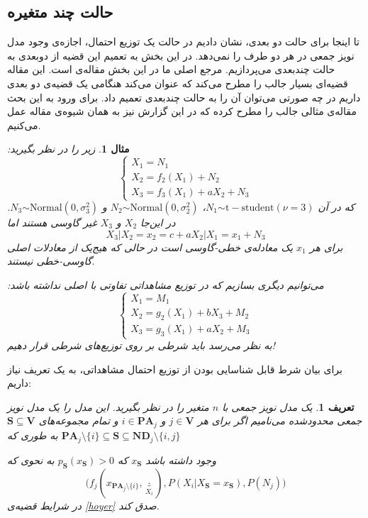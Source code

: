 \documentclass[a4paper,12pt]{article}
\newtheorem{den}{{\large\bf تعریف}}[section]
\newtheorem{exa}{{\large\bf مثال}}[section]
\begin{document}
\subsection{حالت چند متغیره}
تا اینجا برای حالت دو بعدی، نشان دادیم در حالت 
یک توزیع احتمال، اجازه‌ی وجود مدل نویز جمعی در هر دو طرف را نمی‌دهد. در این بخش به تعمیم این قضیه از دوبعدی به حالت چندبعدی می‌پردازیم. مرجع اصلی ما در این بخش مقاله‌ی 
\cite{continous}
است. این مقاله‌ قضیه‌ای بسیار جالب را مطرح می‌کند که عنوان می‌کند هنگامی یک قضیه‌ی 
دو بعدی داریم در چه صورتی می‌توان آن را به حالت چند‌بعدی تعمیم داد. برای ورود به این بحث مقاله‌ی 
\cite{continous}
مثالی جالب را مطرح کرده که در این گزارش نیز به همان شیوه‌ی مقاله عمل می‌کنیم.
\begin{exa}
	زیر را در نظر بگیرید:
	\begin{equation}
	\begin{cases}
	X_1 = N_1\\
	X_2 = f_2(X_1) + N_2\\
	X_3 = f_3(X_1)+aX_2 + N_3
	\end{cases}
	\end{equation}
	که در آن
	$N_1 \stackrel{}{\sim} \mathrm{t-student}(\nu =3)$،
	$N_2 \stackrel{}{\sim} \mathrm{Normal}(0, \sigma_2^2)$ و 
	$N_3 \stackrel{}{\sim}\mathrm{Normal}(0, \sigma_3^2)$.
	در این‌جا $X_2$ و $X_3$ غیر گاوسی هستند  اما
	$$X_3|X_2=x_2 = c + aX_2|X_1=x_1 + N_3$$
	برای هر $x_1$ یک معادله‌ی خطی-گاوسی است در حالی که هیج‌یک از معادلات اصلی 
	گاوسی-خطی نیستند. 
	
	می‌توانیم 
	دیگری بسازیم که در توزیع مشاهداتی تفاوتی با 
	اصلی نداشته باشد:
	\begin{equation}
	\begin{cases}
	X_1 = M_1\\
	X_2 = g_2(X_1) + bX_3 + M_2\\
	X_3 = g_3(X_1)+aX_2 + M_3
	\end{cases}
	\end{equation}
	به نظر می‌رسد باید شرطی بر روی توزیع‌های شرطی قرار دهیم!
\end{exa}
برای بیان شرط قابل شناسایی بودن از توزیع احتمال مشاهداتی، به یک تعریف نیاز داریم:
\begin{den}
	یک مدل نویز جمعی با $n$ متغیر را در نظر بگیرید. این مدل را یک مدل نویز جمعی محدودشده می‌نامیم اگر برای هر 
	$j \in \mathbf{V}$
	و
	$i \in \mathbf{PA}_j$
	و تمام مجموعه‌های
	$\mathbf{S} \subseteq \mathbf{V}$
	به طوری که 
	$\mathbf{PA}_j  \setminus \{i\} \subseteq \mathbf{S} \subseteq \mathbf{ND}_j \setminus \{i, j\}$
	
	وجود داشته ‌باشد 
	$x_{\mathbf{S}}$
	که
	$p_{\mathbf{S}}(x_{\mathbf{S}})>0$
	به نحوی که 
	$$\Big(f_j(x_{\textbf{PA}_{j}\setminus \{i\}}, \underbrace{\cdot}_{X_i}),
	P(X_i | X_{\textbf{S}}=x_{\textbf{S}}), P(N_j)\Big)$$
	در شرایط قضیه‌ی 
	\eqref{hoyer}
	صدق کند.
\end{den}
\end{document}
